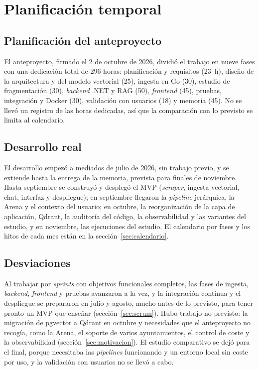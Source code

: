 \section{Planificación temporal}
\label{sec:planificacion}

\subsection{Planificación del anteproyecto}

El anteproyecto, firmado el 2 de octubre de 2026, dividió el trabajo en nueve fases con una dedicación total de 296 horas: planificación y requisitos (23~h), diseño de la arquitectura y del modelo vectorial (25), ingesta en Go (30), estudio de fragmentación (30), \emph{backend} .NET y RAG (50), \emph{frontend} (45), pruebas, integración y Docker (30), validación con usuarios (18) y memoria (45). No se llevó un registro de las horas dedicadas, así que la comparación con lo previsto se limita al calendario.

\subsection{Desarrollo real}
\label{sec:desarrollo-real}

El desarrollo empezó a mediados de julio de 2026, sin trabajo previo, y se extiende hasta la entrega de la memoria, prevista para finales de noviembre. Hasta septiembre se construyó y desplegó el MVP (\emph{scraper}, ingesta vectorial, chat, interfaz y despliegue); en septiembre llegaron la \emph{pipeline} jerárquica, la Arena y el contexto del usuario; en octubre, la reorganización de la capa de aplicación, Qdrant, la auditoría del código, la observabilidad y las variantes del estudio, y en noviembre, las ejecuciones del estudio. El calendario por fases y los hitos de cada mes están en la sección~\ref{sec:calendario}.

\subsection{Desviaciones}

Al trabajar por \emph{sprints} con objetivos funcionales completos, las fases de ingesta, \emph{backend}, \emph{frontend} y pruebas avanzaron a la vez, y la integración continua y el despliegue se prepararon en julio y agosto, mucho antes de lo previsto, para tener pronto un MVP que enseñar (sección~\ref{sec:scrum}). Hubo trabajo no previsto: la migración de pgvector a Qdrant en octubre y necesidades que el anteproyecto no recogía, como la Arena, el soporte de varios ayuntamientos, el control de coste y la observabilidad (sección~\ref{sec:motivacion}). El estudio comparativo se dejó para el final, porque necesitaba las \emph{pipelines} funcionando y un entorno local sin coste por uso, y la validación con usuarios no se llevó a cabo.

